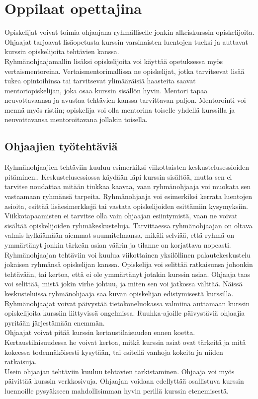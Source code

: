 \documentclass[finnish]{tktltiki2}
\theoremstyle{definition}
\theoremstyle{remark}
\begin{document}
\section{Oppilaat opettajina}
Opiskelijat voivat toimia ohjaajana ryhmälliselle jonkin alkeiskurssin o\-pis\-ke\-li\-joi\-ta\cite{Reges88}. Ohjaajat tarjoavat lisäopetusta kurssin varsinaisten luentojen tueksi ja auttavat kurssin opiskelijoita tehtävien kanssa.
\\
Ryhmänohjaajamallin lisäksi opiskelijoita voi käyttää opetuksessa myös vertaismentoreina.\cite{Tashakkori05} Vertaismentorimallissa ne opiskelijat, jotka tarvitsevat lisää tukea opintoihinsa tai tarvitsevat ylimääräisiä haasteita saavat mentoriopiskelijan, joka osaa kurssin sisällön hyvin. Mentori tapaa neuvottavaansa ja avustaa tehtävien kanssa tarvittavan paljon. Mentorointi voi mennä myös ristiin; opiskelija voi olla mentorina toiselle yhdellä kurssilla ja neuvottavansa mentoroitavana jollakin toisella.


\subsection{Ohjaajien työtehtäviä}
Ryhmänohjaajien tehtäviin kuuluu  esimerkiksi viikottaisten keskustelusessioiden pitäminen.\cite{Reges88}. Keskustelusessiossa käydään läpi kurssin sisältöä, mutta sen ei tarvitse noudattaa mitään tiukkaa kaavaa, vaan ryhmänohjaaja voi muokata sen vastaamaan ryhmänsä tarpeita. Ryhmänohjaaja voi esimerkiksi kerrata luentojen asioita, esittää lisäesimerkkejä tai vastata opiskelijoiden esittämiin kysymyksiin. Viikkotapaamisten ei tarvitse olla vain ohjaajan esiintymistä, vaan ne voivat sisältää opiskelijoiden ryhmäkeskusteluja.\cite{Decker06} Tarvittaessa ryhmänohjaajan on oltava valmis hylkäämään aiemmat suunnitelmansa, mikäli selviää, että ryhmä on ymmärtänyt jonkin tärkeän asian väärin ja tilanne on korjattava nopeasti.\cite{Reges88}
\\
Ryhmänohjaajan tehtäviin voi kuulua viikottainen yksilöllinen palautekeskustelu jokaisen ryhmänsä opiskelijan kanssa. Opiskelija voi selittää ratkaisunsa johonkin tehtävään, tai kertoa, että ei ole ymmärtänyt jotakin kurssin asiaa. Ohjaaja taas voi selittää, mistä jokin virhe johtuu, ja miten sen voi jatkossa välttää. Näissä keskusteluissa ryhmänohjaaja saa kuvan opiskelijan edistymisestä kurssilla.\cite{Reges88,Reges03}
\\
Ryhmänohjaajat voivat päivystää tietokoneluokassa valmiina auttamaan kurssin opiskelijoita kurssiin liittyvissä ongelmissa. Ruuhka-ajoille päivystäviä ohjaajia pyritään järjestämään enemmän.\cite{Reges88, Reges03}
\\
Ohjaajat voivat pitää kurssin kertaustilaisuuden ennen koetta. Kertaustilaisuudessa he voivat kertoa, mitkä kurssin asiat ovat tärkeitä ja mitä kokeessa todennäköisesti kysytään, tai esitellä vanhoja kokeita ja niiden ratkaisuja.\cite{Decker06}
\\
Usein ohjaajan tehtäviin kuuluu tehtävien tarkistaminen. Ohjaaja voi myös päivittää kurssin verkkosivuja.\cite{Dickson11} Ohjaajan voidaan edellyttää osallistuva kurssin luennoille pysyäkseen mahdollisimman hyvin perillä kurssin etenemisestä.\cite{Reges03}
\end{document}
